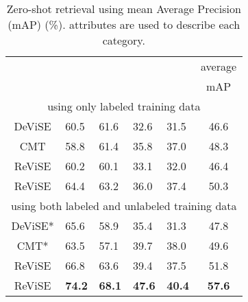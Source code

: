 {\begin{table}[t!]
\centering
\caption{\footnotesize Zero-shot retrieval using mean Average Precision (mAP) (\%).  attributes are used to describe each category.}
\vspace{1mm}
\scalebox{0.72}
{
\begin{tabular}{|c||ll||ll||c|}
\hline
 & \multicolumn{2}{c||}{}                                                      & \multicolumn{2}{c||}{}                                                     & average                          \\
                        & \multicolumn{1}{c}{} & \multicolumn{1}{c||}{} & \multicolumn{1}{c}{} & \multicolumn{1}{c||}{} & mAP \\ \hline\hline
\multicolumn{6}{|c|}{using only labeled training data}                                                                                                                                                                                     \\ \hline \hline
DeViSE \cite{frome2013devise}                         &        60.5        &      61.6       &         32.6           &              31.5            &        46.6           \\
CMT \cite{socher2013zero}                 &         58.8          &       61.4     &       35.8   &        37.0         &   48.3          \\
ReViSE        &     60.2        &    60.1       &    33.1      &       32.0    &       46.4          \\
ReViSE        &     64.4      &     63.2     &     36.0        &              37.4            &      50.3             \\ \hline \hline
\multicolumn{6}{|c|}{using both labeled and unlabeled training data}   \\ \hline \hline
DeViSE* \cite{frome2013devise}             &    65.6      &       58.9       &           35.4     &          31.3          &    47.8                \\
CMT* \cite{socher2013zero}       &    63.5    &    57.1    &     39.7     &              38.0          &   49.6            \\
ReViSE        &    66.8         &     63.6     &     39.4      &    37.5   &       51.8       \\
ReViSE       &    {\bf 74.2 }       &     {\bf 68.1 }   &    {\bf 47.6 }      &  {\bf 40.4  }    &        {\bf 57.6}      \\ \hline
\end{tabular}
}
\label{tbl:induc_zero_retr}
\vspace{-4mm}
\end{table}



}
